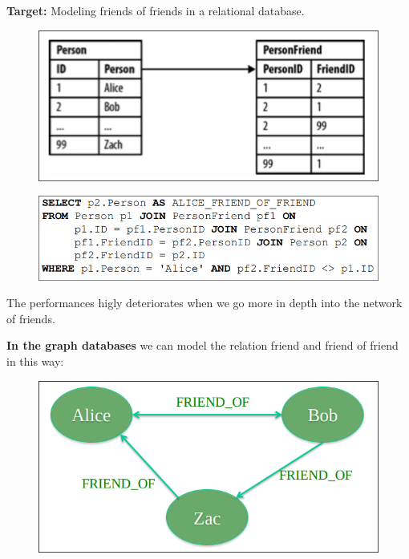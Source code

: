 \textbf{Target:} Modeling friends of friends in a relational database. 

\begin{figure}[htbp]
  \centering
  \includegraphics[scale = 0.5]{Attachments/image.png}
\end{figure}

\begin{figure}[htbp]
  \centering
  \includegraphics[scale = 0.5]{Attachments/image copy.png}
\end{figure}

The performances higly deteriorates when we go more in depth into the network of friends. 

\newpage
\textbf{In the graph databases} we can model the relation friend and friend of friend in this way: 

\begin{figure}[htbp]
  \centering
  \includegraphics[scale = 0.5]{Attachments/image copy 2.png}
\end{figure}

